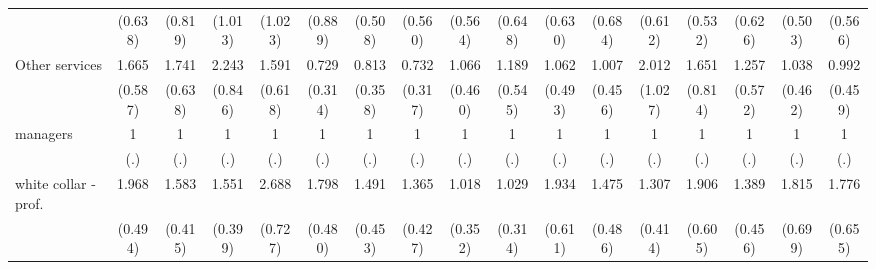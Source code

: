 {\begin{tabular}{l*{16}{c}}
                    &     (0.638)         &     (0.819)         &     (1.013)         &     (1.023)         &     (0.889)         &     (0.508)         &     (0.560)         &     (0.564)         &     (0.648)         &     (0.630)         &     (0.684)         &     (0.612)         &     (0.532)         &     (0.626)         &     (0.503)         &     (0.566)         \\
[1em]
Other services      &       1.665         &       1.741         &       2.243\sym{*}  &       1.591         &       0.729         &       0.813         &       0.732         &       1.066         &       1.189         &       1.062         &       1.007         &       2.012         &       1.651         &       1.257         &       1.038         &       0.992         \\
                    &     (0.587)         &     (0.638)         &     (0.846)         &     (0.618)         &     (0.314)         &     (0.358)         &     (0.317)         &     (0.460)         &     (0.545)         &     (0.493)         &     (0.456)         &     (1.027)         &     (0.814)         &     (0.572)         &     (0.462)         &     (0.459)         \\
[1em]
managers            &           1         &           1         &           1         &           1         &           1         &           1         &           1         &           1         &           1         &           1         &           1         &           1         &           1         &           1         &           1         &           1         \\
                    &         (.)         &         (.)         &         (.)         &         (.)         &         (.)         &         (.)         &         (.)         &         (.)         &         (.)         &         (.)         &         (.)         &         (.)         &         (.)         &         (.)         &         (.)         &         (.)         \\
[1em]
white collar - prof.&       1.968\sym{**} &       1.583         &       1.551         &       2.688\sym{***}&       1.798\sym{*}  &       1.491         &       1.365         &       1.018         &       1.029         &       1.934\sym{*}  &       1.475         &       1.307         &       1.906\sym{*}  &       1.389         &       1.815         &       1.776         \\
                    &     (0.494)         &     (0.415)         &     (0.399)         &     (0.727)         &     (0.480)         &     (0.453)         &     (0.427)         &     (0.352)         &     (0.314)         &     (0.611)         &     (0.486)         &     (0.414)         &     (0.605)         &     (0.456)         &     (0.699)         &     (0.655)         \\

\end{tabular}}
